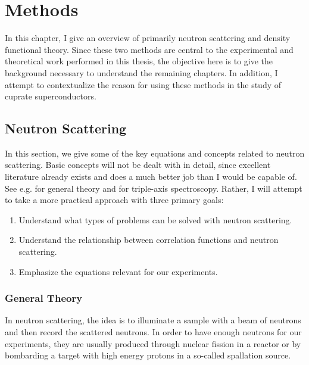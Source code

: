 \newcommand{\jp}{j^\prime}
\newcommand{\jpp}{j^{\prime\prime}}
\newcommand{\lp}{l^\prime}
\newcommand{\lpp}{l^{\prime\prime}}
\newcommand{\fc}{\bm{\Phi}\genfrac{(}{)}{0pt}{}{j \jp}{l \lp}}
\newcommand{\fczero}{\bm{\Phi}\genfrac{(}{)}{0pt}{}{j \jp}{0 \lp}}
\newcommand{\fcb}{\bm{\Theta}\genfrac{(}{)}{0pt}{}{j \jp}{l \lp}}
\newcommand{\fcbpp}{\bm{\Theta}\genfrac{(}{)}{0pt}{}{j \jpp}{l \lpp}}
\newcommand{\fcbf}{-\bm{\Theta}\genfrac{(}{)}{0pt}{}{j \jp}{l \lp} + \delta_{j,\jp} \delta_{l,\lp} \sum_{\jpp, \lpp}  \bm{\Theta}\genfrac{(}{)}{0pt}{}{j \jpp}{l \lpp} }
\newcommand{\rla}[1]{\langle #1 \rangle}
\newcommand*\tageq{\refstepcounter{equation}\tag{\theequation}}

\chapter{Methods}\label{ch:method}
In this chapter, I give an overview of primarily neutron scattering and density functional theory. Since these two methods are central to the experimental and theoretical work performed in this thesis, the objective here is to give the background necessary to understand the remaining chapters. In addition, I attempt to contextualize the reason for using these methods in the study of cuprate superconductors.

\section{Neutron Scattering}\label{sec:neutron}
In this section, we give some of the key equations and concepts related to neutron scattering. Basic concepts will not be dealt with in detail, since excellent literature already exists and does a much better job than I would be capable of. See e.g. \cite{Lovesey1984, Squires2012, Schober2014} for general theory and \cite{Shirane2002} for triple-axis spectroscopy. Rather, I will attempt to take a more practical approach with three primary goals:

\begin{enumerate}
	\item Understand what types of problems can be solved with neutron scattering.
	\item Understand the relationship between correlation functions and neutron scattering.
	\item Emphasize the equations relevant for our experiments.
\end{enumerate}

\subsection{General Theory}
In neutron scattering, the idea is to illuminate a sample with a beam of neutrons and then record the scattered neutrons. In order to have enough neutrons for our experiments, they are usually produced through nuclear fission in a reactor or by bombarding a target with high energy protons in a so-called spallation source.

